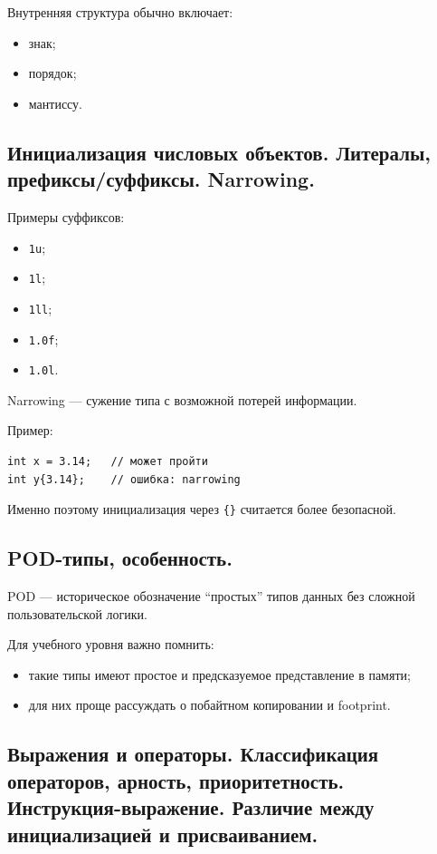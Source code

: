 Внутренняя структура обычно включает:
\begin{itemize}
    \item знак;
    \item порядок;
    \item мантиссу.
\end{itemize}


\subsection{Инициализация числовых объектов. Литералы, префиксы/суффиксы. Narrowing.}

Примеры суффиксов:
\begin{itemize}
    \item \texttt{1u};
    \item \texttt{1l};
    \item \texttt{1ll};
    \item \texttt{1.0f};
    \item \texttt{1.0l}.
\end{itemize}

Narrowing --- сужение типа с возможной потерей информации.

Пример:
\begin{verbatim}
int x = 3.14;   // может пройти
int y{3.14};    // ошибка: narrowing
\end{verbatim}

Именно поэтому инициализация через \texttt{\{\}} считается более безопасной.


\subsection{POD-типы, особенность.}

POD --- историческое обозначение ``простых'' типов данных без сложной пользовательской логики.

Для учебного уровня важно помнить:
\begin{itemize}
    \item такие типы имеют простое и предсказуемое представление в памяти;
    \item для них проще рассуждать о побайтном копировании и footprint.
\end{itemize}


\subsection{Выражения и операторы. Классификация операторов, арность, приоритетность. Инструкция-выражение. Различие между инициализацией и присваиванием.}

